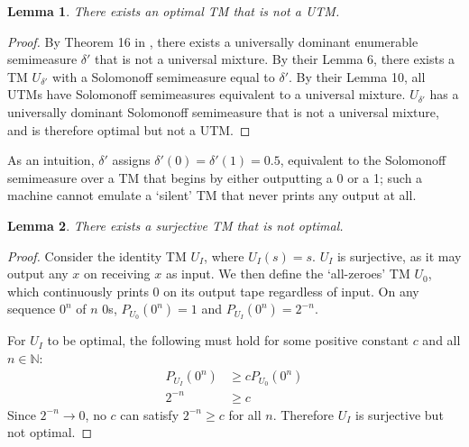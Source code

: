 \documentclass[11pt]{article}
\newtheorem{lemma}{Lemma}[section]
\begin{document}
\begin{lemma}
\label{lm:optimal-neq-utm}
There exists an optimal TM that is not a UTM.
\end{lemma}
\begin{proof}
By Theorem 16 in \citet{Wood2013}, there exists a universally dominant enumerable semimeasure $\delta'$ that is not a universal mixture.
By their Lemma 6, there exists a TM $U_{\delta'}$ with a Solomonoff semimeasure equal to $\delta'$.
By their Lemma 10, all UTMs have Solomonoff semimeasures equivalent to a universal mixture.
$U_{\delta'}$ has a universally dominant Solomonoff semimeasure that is not a universal mixture, and is therefore optimal but not a UTM.
\end{proof}
As an intuition, $\delta'$ assigns $\delta'(0)=\delta'(1)=0.5$, equivalent to the Solomonoff semimeasure over a TM that begins by either outputting a 0 or a 1; such a machine cannot emulate a `silent' TM that never prints any output at all.

\begin{lemma}
\label{lm:surjective-neq-optimal}
    There exists a surjective TM that is not optimal.
\end{lemma}
\begin{proof}
    Consider the identity TM $U_I$, where $U_I(s)=s$. $U_I$ is surjective, as it may output any $x$ on receiving $x$ as input.
    We then define the `all-zeroes' TM %
    $U_0$, which continuously prints 0 on its output tape regardless of input.
    On any sequence $0^n$ of $n$ 0s, $P_{U_0}(0^n)=1$ and $P_{U_I}(0^n)=2^{-n}$.

    For $U_I$ to be optimal, the following must hold for some positive constant $c$ and all $n\in\mathbb{N}$:
    \begin{align*}
    P_{U_I}(0^n) &\geq cP_{U_0}(0^n)\\
    2^{-n} &\geq c
    \end{align*}
    Since $2^{-n}\to 0$, no $c$ can satisfy $2^{-n} \geq c$ for all $n$. Therefore $U_I$ is surjective but not optimal.
\end{proof}
\end{document}
